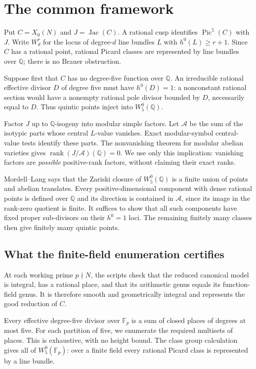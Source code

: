 \documentclass[11pt,a4paper]{article}
\newcommand{\Q}{\mathbb Q}
\newcommand{\F}{\mathbb F}
\newcommand{\Pic}{\operatorname{Pic}}
\newcommand{\Jac}{\operatorname{Jac}}
\newcommand{\A}{\mathcal A}
\newcommand{\W}{W^0_5}
\begin{document}
\section{The common framework}\label{sec:framework}
Put $C=X_0(N)$ and $J=\Jac(C)$. A rational cusp identifies $\Pic^5(C)$
with $J$. Write $W^r_d$ for the locus of degree-$d$ line bundles $L$
with $h^0(L)\ge r+1$. Since $C$ has a rational point, rational Picard
classes are represented by line bundles over $\Q$; there is no Brauer
obstruction.

Suppose first that $C$ has no degree-five function over $\Q$.
An irreducible rational effective divisor $D$ of degree five must have
$h^0(D)=1$: a nonconstant rational section would have a nonempty
rational pole divisor bounded by $D$, necessarily equal to $D$.
Thus quintic points inject into $\W(\Q)$.

Factor $J$ up to $\Q$-isogeny into modular simple factors. Let $\A$
be the sum of the isotypic parts whose central $L$-value vanishes.
Exact modular-symbol central-value tests identify these parts.
The nonvanishing theorem for modular abelian varieties \cite{KL}
gives $\operatorname{rank}(J/\A)(\Q)=0$.
We use only this implication: vanishing factors are \emph{possible}
positive-rank factors, without claiming their exact ranks.

Mordell--Lang \cite{Faltings} says that the Zariski closure of $\W(\Q)$
is a finite union of points and abelian translates. Every positive-dimensional
component with dense rational points is defined over $\Q$ and its direction
is contained in $\A$, since its image in the rank-zero quotient is finite.
It suffices to show that all such components have fixed proper
sub-divisors on their $h^0=1$ loci. The remaining finitely many classes
then give finitely many quintic points.

\subsection{What the finite-field enumeration certifies}
At each working prime $p\nmid N$, the scripts check that the reduced
canonical model is integral, has a rational place, and that its arithmetic
genus equals its function-field genus. It is therefore smooth and
geometrically integral and represents the good reduction of $C$.

Every effective degree-five divisor over $\F_p$ is a sum of closed places
of degrees at most five. For each partition of five, we enumerate the
required multisets of places. This is exhaustive, with no height bound.
The class group calculation gives all of $\W(\F_p)$: over a finite field
every rational Picard class is represented by a line bundle.
\end{document}
